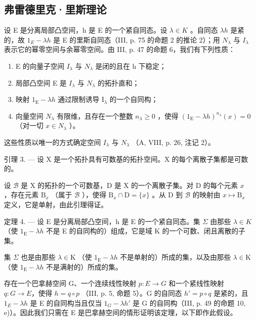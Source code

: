 \subsection{弗雷德里克·里斯理论}

设 E 是分离局部凸空间，h 是 E 的一个紧自同态。设 \(\lambda \in K\) 。自同态 \(\lambda h\) 是紧的，故 \(1_{E} - \lambda h\) 是 E 的里斯自同态（III, p. 75 的命题 2 的推论 2）；用 \(N_{\lambda}\) 与 \(I_{\lambda}\) 表示它的幂零空间与余幂零空间。由 III, p. 47 的命题 6，我们有下列性质：

\begin{enumerate}
\def\labelenumi{(\roman{enumi})}
\item
  E 的向量子空间 \(I_{\lambda}\) 与 \(N_{\lambda}\) 是闭的且在 h 下稳定；
\item
  局部凸空间 E 是 \(I_{\lambda}\) 与 \(N_{\lambda}\) 的拓扑直和；
\item
  映射 \(1_{\mathrm{E}} - \lambda h\) 通过限制诱导 \(\mathrm{I}_{\lambda}\) 的一个自同构；
\item
  向量空间 \(N_{\lambda}\) 有限维，且存在一个整数 \(n_{\lambda} \geqslant 0\) ，使得 \((1_{\mathrm{E}} - \lambda h)^{n_{\lambda}}(x) = 0\) （对一切 \(x \in N_{\lambda}\) ）。
\end{enumerate}

这些性质以唯一的方式确定空间 \(I_{\lambda}\) 与 \(N_{\lambda}\) （A, VIII, p. 26, 注记 2）。

引理 3. --- 设 X 是一个拓扑具有可数基的拓扑空间。X 的每个离散子集都是可数的。

设 \(\mathcal{B}\) 是 X 的拓扑的一个可数基，D 是 X 的一个离散子集。对 D 的每个元素 \(x\) ，存在元素 \(\mathrm{B}_x\) （属于 \(\mathcal{B}\) ），使得 \(\mathrm{B}_x \cap \mathrm{D} = \{x\}\) 。从 D 到 \(\mathcal{B}\) 的映射由 \(x \mapsto \mathrm{B}_x\) 定义，它是单射，由此引理得证。

定理 4. --- 设 E 是分离局部凸空间，h 是 E 的一个紧自同态。集 \(\Sigma\) 由那些 \(\lambda \in K\) （使 \(1_{\mathrm{E}} - \lambda h\) 不是 E 的自同构的）组成，它是域 K 的一个可数、闭且离散的子集。

集 \(\Sigma\) 也是由那些 \(\lambda\in\mathrm{K}\) （使 \(1_{\mathrm{E}}-\lambda h\) 不是单射的）所成的集，以及由那些 \(\lambda\in\mathrm{K}\) （使 \(1_{\mathrm{E}}-\lambda h\) 不是满射的）所成的集。

存在一个巴拿赫空间 G、一个连续线性映射 \(p: E \rightarrow G\) 和一个紧线性映射 \(q: G \rightarrow E\)，使得 \(h = q \circ p\) （III, p. 5, 命题 5）。G 的自同态 \(h' = p \circ q\) 是紧的，且 \(1_{E} - \lambda h\) 是 E 的自同构当且仅当 \(1_{G} - \lambda h'\) 是 G 的自同构（III, p. 49 的命题 10, e)）。因此我们只需在 E 是巴拿赫空间的情形证明该定理，以下即作此假设。


